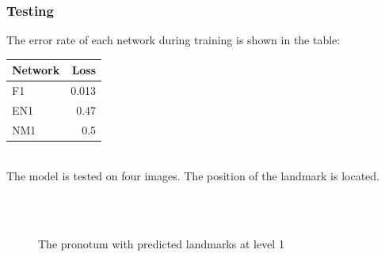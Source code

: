 \subsubsection{Testing}
The error rate of each network during training is shown in the table:\\
\begin{table}[h!]
	\centering
	\begin{tabular}{l r}
	Network & Loss \\ \hline
	F1 & 0.013 \\ \hline
	EN1 & 0.47\\ \hline
	NM1 &  0.5
	\end{tabular}
\end{table}\\
The model is tested on four images. The position of the landmark is located.
\begin{figure}[h!]
\centering
{}~~
\\
~~
\\
\caption{The pronotum with predicted landmarks at level 1}
\label{figcentroidSize}
\end{figure}
